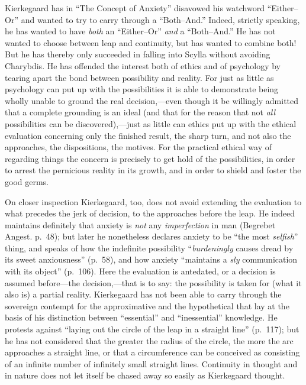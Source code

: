 \documentclass[12pt,a4paper]{book}
\newcommand{\opage}[1]{\marginnote{\footnotesize\textit{[#1]}}}
\begin{document}
\opage{77}Kierkegaard has in ``The Concept of Anxiety'' disavowed his watchword
``Either--Or'' and wanted to try to carry through a ``Both--And.''
Indeed, strictly speaking, he has wanted to have \textit{both} an
``Either--Or'' \textit{and} a ``Both--And.'' He has not wanted to choose
between leap and continuity, but has wanted to combine both! But he has
thereby only succeeded in falling into Scylla without avoiding Charybdis.
He has offended the interest both of ethics and of psychology by tearing
apart the bond between possibility and reality. For just as little as
psychology can put up with the possibilities it is able to demonstrate
being wholly unable to ground the real decision,---even though it be
willingly
admitted that a complete grounding is an ideal (and that for the reason
that not \textit{all} possibilities can be discovered),---just as little
can ethics put up with the ethical evaluation concerning only the
finished result, the sharp turn, and not also the approaches, the
dispositions, the motives. For the practical ethical way of regarding
things the concern is precisely to get hold of the possibilities, in
order to arrest the pernicious reality in its growth, and in order to
shield and foster the good germs.

On closer inspection Kierkegaard, too, does not avoid extending the
evaluation to what precedes the jerk of decision, to the approaches
before the leap. He indeed maintains definitely that anxiety is
\textit{not} any \textit{imperfection} in man (Begrebet Angest. p.~48);
but later he nonetheless declares anxiety to be ``the most
\textit{selfish}'' thing, and speaks of how the indefinite possibility
``\textit{burdeningly} causes dread by its sweet anxiousness'' (p.~58),
and how anxiety ``maintains a \textit{sly} communication with its
object'' (p.~106). Here the evaluation is antedated, or a decision is
assumed before---the decision,---that is to say: the possibility is taken
for (what it also is) a partial reality.
\opage{78}Kierkegaard has not been able to carry through the sovereign contempt
for the approximative and the hypothetical that lay at the basis of his
distinction between ``essential'' and ``inessential'' knowledge. He
protests against ``laying out the circle of the leap in a straight
line'' (p.~117); but he has not considered that the greater the radius
of the circle, the more the arc approaches a straight line, or that a
circumference can be conceived as consisting of an infinite number of
infinitely small straight lines. Continuity in thought and in nature does
not let itself be chased away so easily as Kierkegaard thought.
\end{document}
